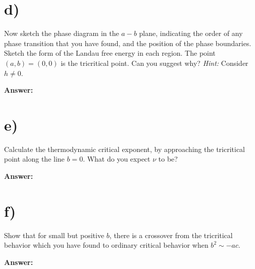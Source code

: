 \documentclass[a4paper]{article}
\newcommand{\newparagraph}{\vspace{.5cm}\noindent}
\begin{document}
\section*{d)}
Now sketch the phase diagram in the $a-b$ plane, indicating the order of any phase transition that you have found, and the position of the phase boundaries.
Sketch the form of the Landau free energy in each region.
The point $(a,b) = (0,0)$ is the tricritical point.
Can you suggest why? \textit{Hint:} Consider $h \neq 0$.


\newparagraph
\textbf{Answer: }


\section*{e)}
Calculate the thermodynamic critical exponent, by approaching the tricritical point along the line $b = 0$.
What do you expect $\nu$ to be?

\newparagraph
\textbf{Answer: }


\section*{f)}
Show that for small but positive $b$, there is a crossover from the tricritical behavior which you have found to ordinary critical behavior when $b^2\sim - ac$.

\newparagraph
\textbf{Answer: }
\end{document}
